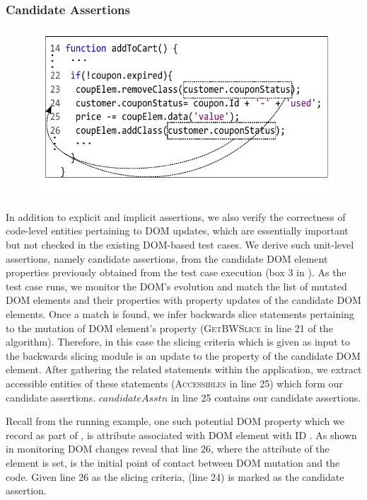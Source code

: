 \subsubsection{Candidate Assertions} \label{Sec:candidateAssertions}
\begin{figure}[!t]
  \centering
  \includegraphics[width=.9\hsize]{fig/candidateDOMToCode}
  \vspace{-0.1in} 
  \label{Fig:candidateDOMToCode}
  \vspace{-0.1in} 
\end{figure}
In addition to explicit and implicit assertions, we also verify the correctness of code-level entities pertaining to DOM updates, which are essentially important but not checked in the existing DOM-based test cases. We derive such unit-level assertions, namely candidate assertions, from the candidate DOM element properties previously obtained from the test case execution (box 3 in ). As the test case runs, we monitor the DOM's evolution and match the list of mutated DOM elements and their properties with property updates of the candidate DOM elements. Once a match is found, we infer backwards slice statements pertaining to the mutation of DOM element's property (\textsc{GetBWSlice} in line 21 of the algorithm). Therefore, in this case the slicing criteria which is given as input to the backwards slicing module is an update to the property of the candidate DOM element.
After gathering the related \javascript statements within the application, we extract accessible entities of these statements (\textsc{Accessibles} in line 25) which form our candidate assertions. $candidateAsstn$ in line 25 contains our candidate assertions. 

Recall from the running example, one such potential DOM property which we record as part of , is  attribute associated with DOM element with ID . As shown in  monitoring DOM changes reveal that line 26, where the  attribute of the element is set, is the initial point of contact between DOM mutation and the \javascript code. Given line 26 as the slicing criteria,  (line 24) is marked as the candidate assertion.